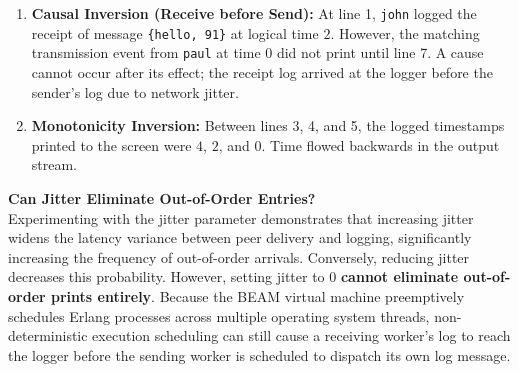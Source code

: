 \documentclass[a4paper, 11pt]{article}
\begin{document}
\begin{enumerate}
    \item \textbf{Causal Inversion (Receive before Send):} At line 1, \texttt{john} logged the receipt of message \texttt{\{hello, 91\}} at logical time $2$. However, the matching transmission event from \texttt{paul} at time $0$ did not print until line 7. A cause cannot occur after its effect; the receipt log arrived at the logger before the sender's log due to network jitter.
    \item \textbf{Monotonicity Inversion:} Between lines 3, 4, and 5, the logged timestamps printed to the screen were $4$, $2$, and $0$. Time flowed backwards in the output stream.
\end{enumerate}

\textbf{Can Jitter Eliminate Out-of-Order Entries?} \\
Experimenting with the jitter parameter demonstrates that increasing jitter widens the latency variance between peer delivery and logging, significantly increasing the frequency of out-of-order arrivals. Conversely, reducing jitter decreases this probability. However, setting jitter to 0 \textbf{cannot eliminate out-of-order prints entirely}. Because the BEAM virtual machine preemptively schedules Erlang processes across multiple operating system threads, non-deterministic execution scheduling can still cause a receiving worker's log to reach the logger before the sending worker is scheduled to dispatch its own log message.
\end{document}
